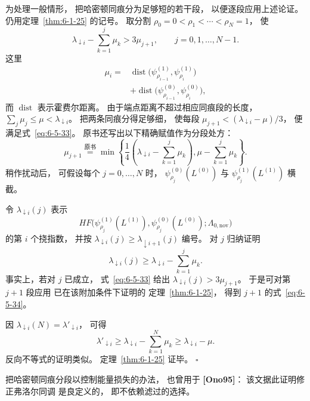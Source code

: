 为处理一般情形，
把哈密顿同痕分为足够短的若干段，
以便逐段应用上述论证。
仍用定理~\ref{thm:6-1-25} 的记号。
取分割
$\rho_0=0<\rho_1<\cdots<\rho_N=1$，
使
\begin{equation}
\lambda_{\downarrow i}
-\sum_{k=1}^{j}\mu_k
>3\mu_{j+1},
\qquad j=0,1,\ldots,N-1.
\tag{6.5.33}\label{eq:6-5-33}
\end{equation}
这里
\[
\begin{aligned}
\mu_i
={}&\operatorname{dist}
\bigl(\psi_{\rho_{i-1}}^{(1)},
\psi_{\rho_i}^{(1)}\bigr)\\
&+\operatorname{dist}
\bigl(\psi_{\rho_{i-1}}^{(0)},
\psi_{\rho_i}^{(0)}\bigr),
\end{aligned}
\]
而 $\operatorname{dist}$ 表示霍费尔距离。
由于端点距离不超过相应同痕段的长度，
$\sum_j\mu_j\le\mu<\lambda_{\downarrow i}$。
把两条同痕分得足够细，
使每段
$\mu_{j+1}<
(\lambda_{\downarrow i}-\mu)/3$，
便满足式~\eqref{eq:6-5-33}。
原书还写出以下精确赋值作为分段处方：
\[
\mu_{j+1}
\stackrel{\text{原书}}{=}
\min\left\{
\frac14\left(
\lambda_{\downarrow i}
-\sum_{k=1}^{j}\mu_k\right),
\mu-\sum_{k=1}^{j}\mu_k
\right\}.
\]
稍作扰动后，
可假设每个 $j=0,\ldots,N$ 时，
$\psi_{\rho_j}^{(0)}(L^{(0)})$
与 $\psi_{\rho_j}^{(1)}(L^{(1)})$
横截。

令 $\lambda_{\downarrow i}(j)$
表示
\[
HF\bigl(
\psi_{\rho_j}^{(1)}(L^{(1)}),
\psi_{\rho_j}^{(0)}(L^{(0)});
\Lambda_{0,\mathrm{nov}}
\bigr)
\]
的第 $i$ 个挠指数，
并按
$\lambda_{\downarrow i}(j)
\ge\lambda_{\downarrow i+1}(j)$
编号。
对 $j$ 归纳证明
\begin{equation}
\lambda_{\downarrow i}(j)
\ge\lambda_{\downarrow i}
-\sum_{k=1}^{j}\mu_k.
\tag{6.5.34}\label{eq:6-5-34}
\end{equation}
事实上，若对 $j$ 已成立，
式~\eqref{eq:6-5-33} 给出
$\lambda_{\downarrow i}(j)
>3\mu_{j+1}$。
于是可对第 $j+1$ 段应用
已在该附加条件下证明的
定理~\ref{thm:6-1-25}，
得到 $j+1$ 的式~\eqref{eq:6-5-34}。

因 $\lambda_{\downarrow i}(N)
=\lambda'_{\downarrow i}$，
可得
\[
\lambda'_{\downarrow i}
\ge\lambda_{\downarrow i}
-\sum_{k=1}^{N}\mu_k
\ge\lambda_{\downarrow i}-\mu.
\]
反向不等式的证明类似。
定理~\ref{thm:6-1-25} 证毕。
\hfill$\square$

把哈密顿同痕分段以控制能量损失的办法，
也曾用于 \textbf{[Ono95]}：
该文据此证明修正弗洛尔同调
是良定义的，
即不依赖滤过的选择。
